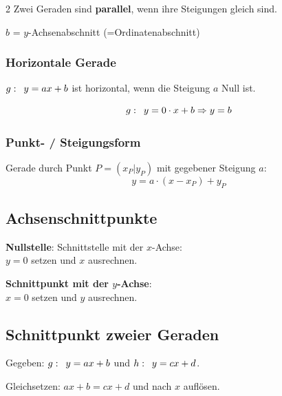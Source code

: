 \begin{multicols}{2}
Zwei Geraden sind \textbf{parallel}, wenn ihre Steigungen gleich sind.

$b$ = $y$-Achsenabschnitt (=Ordinatenabschnitt)


\headerUndFooterJedeSeite{}

\subsubsection*{Horizontale Gerade}

$g\-:\,\,\, y=ax+b$ ist horizontal, wenn die Steigung $a$ Null ist.

$$g\-:\,\,\,  y=0\cdot{}x+b \Rightarrow y=b$$


\ifdefined\versionHECH%
\subsubsection*{Punkt- / Steigungsform}
Gerade durch Punkt $P=(x_P|y_P)$ mit gegebener Steigung $a$:
$$y = a\cdot{}(x-x_P) + y_P$$
\fi

\subsection*{Achsenschnittpunkte}

\textbf{Nullstelle}: Schnittstelle mit der $x$-Achse:\\
$y=0$ setzen und $x$ ausrechnen.


\textbf{Schnittpunkt mit der $y$-Achse}:\\
$x=0$ setzen und $y$ ausrechnen.


\subsection*{Schnittpunkt zweier Geraden}
Gegeben: $g\-:\,\,\, y=ax+b$ und $h\-:\,\,\, y=cx+d$.

Gleichsetzen: $ax+b = cx+d$ und nach $x$ auflösen.






\end{multicols}

